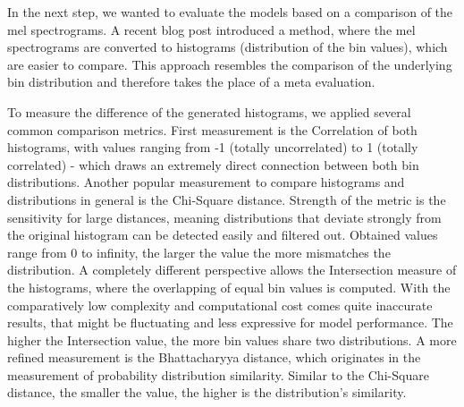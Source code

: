 \documentclass[a4paper]{article}
\begin{document}
	In the next step, we wanted to evaluate the models based on a comparison of the mel spectrograms. A recent blog post introduced a method, where the mel spectrograms are converted to histograms (distribution of the bin values), which are easier to compare. \cite{mel-spectrogram} This approach resembles the comparison of the underlying bin distribution and therefore takes the place of a meta evaluation. 
	
	To measure the difference of the generated histograms, we applied several common comparison metrics. First measurement is the Correlation of both histograms, with values ranging from -1 (totally uncorrelated) to 1 (totally correlated) - which draws an extremely direct connection between both bin distributions. Another popular measurement to compare histograms and distributions in general is the Chi-Square distance. Strength of the metric is the sensitivity for large distances, meaning distributions that deviate strongly from the original histogram can be detected easily and filtered out. Obtained values range from 0 to infinity, the larger the value the more mismatches the distribution. A completely different perspective allows the Intersection measure of the histograms, where the overlapping of equal bin values is computed. With the comparatively low complexity and computational cost comes quite inaccurate results, that might be fluctuating and less expressive for model performance. The higher the Intersection value, the more bin values share two distributions. A more refined measurement is the Bhattacharyya distance, which originates in the measurement of probability distribution similarity. Similar to the Chi-Square distance, the smaller the value, the higher is the distribution’s similarity. 
	
	\begin{table}[ht]
		\centering
		\caption{averaged scores of the historgram similarity to ground-truth across different models}
		\label{tab:quantitative_eval}
	\end{table}
	
\end{document}
